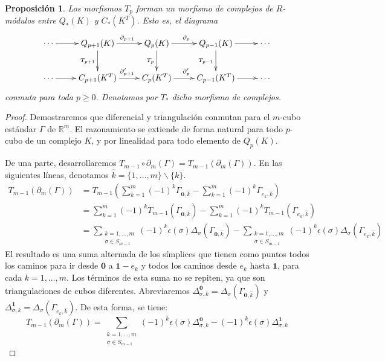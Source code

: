 \documentclass[12pt,a4paper,twoside]{article} %
\theoremstyle{plain}
\newtheorem{proposicion}{Proposición}[subsection]
\theoremstyle{definition}
\newcommand{\R}{\mathbb{R}}
\begin{document}
\begin{proposicion}
Los morfismos $T_p$ forman un morfismo de complejos de $R$-módulos entre $Q_*(K)$ y $C_*(K^T)$. Esto es, el diagrama
\begin{equation*}
\xymatrix{
\cdots \ar[r]    & Q_{p+1}(K) \ar[d]_{T_{p+1}}\ar[r]^{\partial_{p+1}}   & Q_{p}(K) \ar[d]_{T_{p}}\ar[r]^{\partial_{p}}    & Q_{p-1}(K) \ar[d]_{T_{p-1}}\ar[r] & \cdots \\
\cdots \ar[r]    & C_{p+1}(K^T) \ar[r]^{\partial'_{p+1}}                & C_{p}(K^T) \ar[r]^{\partial'_{p}}               & C_{p-1}(K^T) \ar[r]               & \cdots
}
\end{equation*}
conmuta para toda $p \geq 0$. Denotamos por $T_*$ dicho morfismo de complejos.
\end{proposicion}

\begin{proof}
Demostraremos que diferencial y triangulación conmutan para el $m$-cubo estándar $\Gamma$ de $\R^m$. El razonamiento se extiende de forma natural para todo $p$-cubo de un complejo $K$, y por linealidad para todo elemento de $Q_p(K)$.

De una parte, desarrollaremos $T_{m-1} \circ \partial_m (\Gamma) = T_{m-1} \left( \partial_m (\Gamma) \right)$. En las siguientes líneas, denotamos $\hat{k}=\{1,\dots,m\}\backslash\{k\}$.
\begin{align*}
T_{m-1} \left( \partial_m (\Gamma) \right) &= T_{m-1} \left( \sum_{k=1}^m (-1)^{k} \Gamma_{\bm{0},\hat{k}} - \sum_{k=1}^m (-1)^{k} \Gamma_{e_k,\hat{k}} \right) \\
                                           &= \sum_{k=1}^m (-1)^{k} T_{m-1} \left( \Gamma_{\bm{0},\hat{k}} \right) - \sum_{k=1}^m (-1)^{k} T_{m-1} \left( \Gamma_{e_k,\hat{k}} \right) \\
                                           &= \sum_{\substack{k=1,\dots,m \\ \sigma \in S_{m-1}}} (-1)^{k} \epsilon(\sigma) \Delta_\sigma\left( \Gamma_{\bm{0},\hat{k}} \right) - \sum_{\substack{k=1,\dots,m \\ \sigma \in S_{m-1}}} (-1)^{k} \epsilon(\sigma) \Delta_\sigma \left( \Gamma_{e_k,\hat{k}} \right) 
\end{align*}
El resultado es una suma alternada de los símplices que tienen como puntos todos los caminos para ir desde $\bm{0}$ a $\bm{1}-e_k$ y todos los caminos desde $e_k$ hasta $\bm{1}$, para cada $k=1,\dots,m$. Los términos de esta suma no se repiten, ya que son triangulaciones de cubos diferentes. Abreviaremos $\Delta_{\sigma,k}^{\bm{0}}= \Delta_\sigma ( \Gamma_{\bm{0},\hat{k}})$ y $\Delta_{\sigma,k}^{\bm{1}}= \Delta_\sigma ( \Gamma_{e_k,\hat{k}})$. De esta forma, se tiene:
$$
T_{m-1} \left( \partial_m (\Gamma) \right) = \sum_{\substack{k=1,\dots,m \\ \sigma \in S_{m-1}}} (-1)^{k} \epsilon(\sigma) \Delta_{\sigma,k}^{\bm{0}} - (-1)^{k} \epsilon(\sigma) \Delta_{\sigma,k}^{\bm{1}}
$$


\end{proof}
\end{document}
